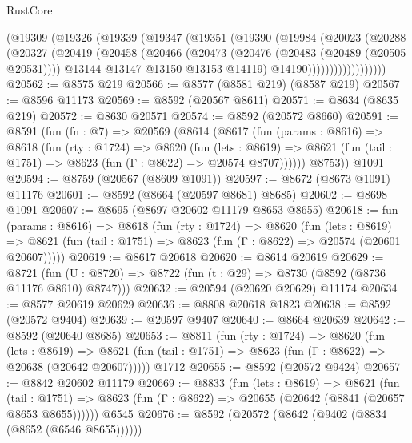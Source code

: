 \begin{lexlean}{RustCore}
\begin{coremodule}
              (@19309
                (@19326
                  (@19339
                    (@19347
                      (@19351
                        (@19390
                          (@19984
                            (@20023
                              (@20288
                                (@20327
                                  (@20419
                                    (@20458
                                      (@20466
                                        (@20473
                                          (@20476 (@20483 (@20489 (@20505 @20531))))
                                          @13144
                                          @13147
                                          @13150
                                          @13153
                                          @14119)
                                        @14190))))))))))))))))))
@20562 := @8575 @219
@20566 := @8577 (@8581 @219) (@8587 @219)
@20567 := @8596 @11173
@20569 := @8592 (@20567 @8611)
@20571 := @8634 (@8635 @219)
@20572 := @8630 @20571
@20574 := @8592 (@20572 @8660)
@20591 := @8591
    (fun (fn : @7) =>
    @20569
      (@8614
        (@8617
          (fun (params : @8616) =>
          @8618
            (fun (rty : @1724) =>
            @8620
              (fun (lets : @8619) =>
              @8621 (fun (tail : @1751) => @8623 (fun (Γ : @8622) => @20574 @8707))))))
        @8753))
    @1091
@20594 := @8759 (@20567 (@8609 @1091))
@20597 := @8672 (@8673 @1091) @11176
@20601 := @8592 (@8664 (@20597 @8681) @8685)
@20602 := @8698 @1091
@20607 := @8695 (@8697 @20602 @11179 @8653 @8655)
@20618 := fun (params : @8616) =>
  @8618
    (fun (rty : @1724) =>
    @8620
      (fun (lets : @8619) =>
      @8621 (fun (tail : @1751) => @8623 (fun (Γ : @8622) => @20574 (@20601 @20607)))))
@20619 := @8617 @20618
@20620 := @8614 @20619
@20629 := @8721
    (fun (U : @8720) => @8722 (fun (t : @29) => @8730 (@8592 (@8736 @11176 @8610) @8747)))
@20632 := @20594 (@20620 @20629) @11174
@20634 := @8577 @20619 @20629
@20636 := @8808 @20618 @1823
@20638 := @8592 (@20572 @9404)
@20639 := @20597 @9407
@20640 := @8664 @20639
@20642 := @8592 (@20640 @8685)
@20653 := @8811
    (fun (rty : @1724) =>
    @8620
      (fun (lets : @8619) =>
      @8621 (fun (tail : @1751) => @8623 (fun (Γ : @8622) => @20638 (@20642 @20607)))))
    @1712
@20655 := @8592 (@20572 @9424)
@20657 := @8842 @20602 @11179
@20669 := @8833
    (fun (lets : @8619) =>
    @8621
      (fun (tail : @1751) =>
      @8623 (fun (Γ : @8622) => @20655 (@20642 (@8841 (@20657 @8653 @8655))))))
    @6545
@20676 := @8592 (@20572 (@8642 (@9402 (@8834 (@8652 (@6546 @8655))))))

\end{coremodule}
\end{lexlean}
